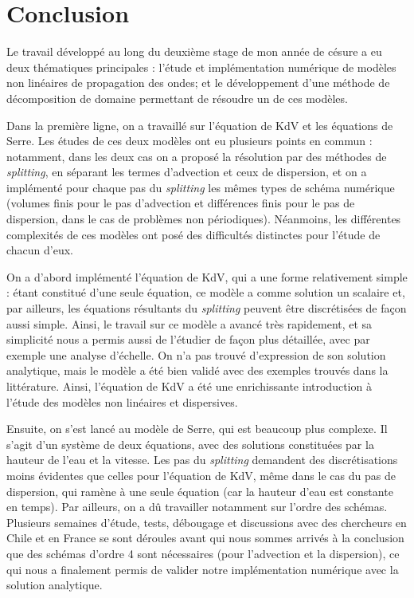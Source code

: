 \section{Conclusion}

\indent Le travail développé au long du deuxième stage de mon année de césure a eu deux thématiques principales : l'étude et implémentation numérique de modèles non linéaires de propagation des ondes; et le développement d'une méthode de décomposition de domaine permettant de résoudre un de ces modèles.

\indent Dans la première ligne, on a travaillé sur l'équation de KdV et les équations de Serre. Les études de ces deux modèles ont eu plusieurs points en commun : notamment, dans les deux cas on a proposé la résolution par des méthodes de \emph{splitting}, en séparant les termes d'advection et ceux de dispersion, et on a implémenté pour chaque pas du \emph{splitting} les mêmes types de schéma numérique (volumes finis pour le pas d'advection et différences finis pour le pas de dispersion, dans le cas de problèmes non périodiques). Néanmoins, les différentes complexités de ces modèles ont posé des difficultés distinctes pour l'étude de chacun d'eux.

\indent On a d'abord implémenté l'équation de KdV, qui a une forme relativement simple : étant constitué d'une seule équation, ce modèle a comme solution un scalaire et, par ailleurs, les équations résultants du \emph{splitting} peuvent être discrétisées de façon aussi simple. Ainsi, le travail sur ce modèle a avancé très rapidement, et sa simplicité nous a permis aussi de l'étudier de façon plus détaillée, avec par exemple une analyse d'échelle. On n'a pas trouvé d'expression de son solution analytique, mais le modèle a été bien validé avec des exemples trouvés dans la littérature. Ainsi, l'équation de KdV a été une enrichissante introduction à l'étude des modèles non linéaires et dispersives. 

\indent Ensuite, on s'est lancé au modèle de Serre, qui est beaucoup plus complexe. Il s'agit d'un système de deux équations, avec des solutions constituées par la hauteur de l'eau et la vitesse. Les pas du \emph{splitting} demandent des discrétisations moins évidentes que celles pour l'équation de KdV, même dans le cas du pas de dispersion, qui ramène à une seule équation (car la hauteur d'eau est constante en temps). Par ailleurs, on a dû travailler notamment sur l'ordre des schémas. Plusieurs semaines d'étude, tests, débougage et discussions avec des chercheurs en Chile et en France se sont déroules avant qui nous sommes arrivés à la conclusion que des schémas d'ordre 4 sont nécessaires (pour l'advection et la dispersion), ce qui nous a finalement permis de valider notre implémentation numérique avec la solution analytique.


